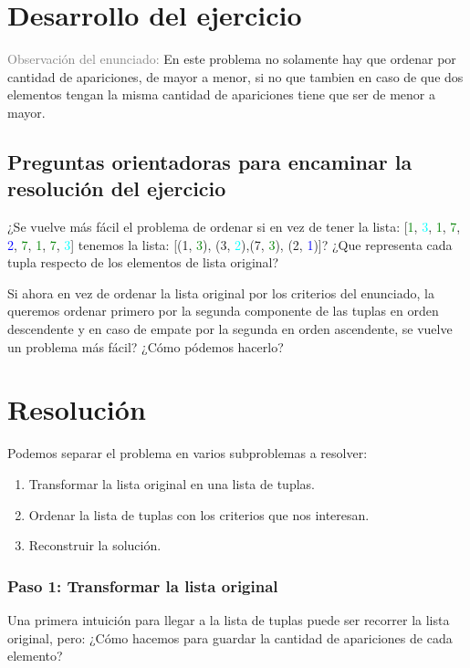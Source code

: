 \documentclass{article}
\newcommand{\meta}[1]{\textcolor{gray}{#1}}
\begin{document}
\section*{Desarrollo del ejercicio}
\meta{Observación del enunciado:} En este problema no solamente hay que ordenar por cantidad de apariciones, de mayor a menor, si no que tambien en caso de que dos elementos tengan la misma cantidad de apariciones tiene que ser de menor a mayor. 

\subsection{Preguntas orientadoras para encaminar la resolución del ejercicio}
¿Se vuelve más fácil el problema de ordenar si en vez de tener la lista: [\textcolor{green}{1}, \textcolor{cyan}{3}, \textcolor{green}{1}, \textcolor{green}{7}, \textcolor{blue}{2}, \textcolor{green}{7}, \textcolor{green}{1}, \textcolor{green}{7}, \textcolor{cyan}{3}] tenemos la lista: 
[(1, \textcolor{green}{3}), (3, \textcolor{cyan}{2}),(7, \textcolor{green}{3}), (2, \textcolor{blue}{1})]? 
¿Que representa cada tupla respecto de los elementos de lista original?

Si ahora en vez de ordenar la lista original por los criterios del enunciado, la queremos ordenar primero por la segunda componente de las tuplas en orden descendente y en caso de empate por la segunda en orden ascendente, se vuelve un problema más fácil? ¿Cómo pódemos hacerlo?

\section*{Resolución}
Podemos separar el problema en varios subproblemas a resolver:
\begin{enumerate}
    \item Transformar la lista original en una lista de tuplas.
    \item Ordenar la lista de tuplas con los criterios que nos interesan.
    \item Reconstruir la solución.
\end{enumerate}
\subsubsection*{Paso 1: Transformar la lista original}
Una primera intuición para llegar a la lista de tuplas puede ser recorrer la lista original, pero: ¿Cómo hacemos para guardar la cantidad de apariciones de cada elemento?
\end{document}
